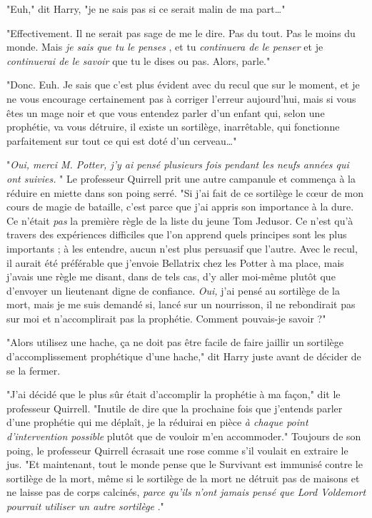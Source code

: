 "Euh," dit Harry, "je ne sais pas si ce serait malin de ma part…"

"Effectivement. Il ne serait pas sage de me le dire. Pas du tout. Pas le moins du monde. Mais \emph{je sais que tu le penses} , et tu \emph{continuera de le penser}  et je \emph{continuerai de le savoir}  que tu le dises ou pas. Alors, parle."

"Donc. Euh. Je sais que c'est plus évident avec du recul que sur le moment, et je ne vous encourage certainement pas à corriger l'erreur aujourd'hui, mais si vous êtes un mage noir et que vous entendez parler d'un enfant qui, selon une prophétie, va vous détruire, il existe un sortilège, inarrêtable, qui fonctionne parfaitement sur tout ce qui est doté d'un cerveau…"

"\emph{Oui, merci M. Potter, j'y ai pensé plusieurs fois pendant les neufs années qui ont suivies.} " Le professeur Quirrell prit une autre campanule et commença à la réduire en miette dans son poing serré. "Si j'ai fait de ce sortilège le cœur de mon cours de magie de bataille, c'est parce que j'ai appris son importance à la dure. Ce n'était \emph{pas}  la première règle de la liste du jeune Tom Jedusor. Ce n'est qu'à travers des expériences difficiles que l'on apprend quels principes sont les plus importants ; à les entendre, aucun n'est plus persuasif que l'autre. Avec le recul, il aurait été préférable que j'envoie Bellatrix chez les Potter à ma place, mais j'avais une règle me disant, dans de tels cas, d'y aller moi-même plutôt que d'envoyer un lieutenant digne de confiance. \emph{Oui,}  j'ai pensé au sortilège de la mort, mais je me suis demandé si, lancé sur un nourrisson, il ne rebondirait pas sur moi et n'accomplirait pas la prophétie. Comment pouvais-je savoir ?"

"Alors utilisez une hache, ça ne doit pas être facile de faire jaillir un sortilège d'accomplissement prophétique d'une hache," dit Harry juste avant de décider de se la fermer.

"J'ai décidé que le plus sûr était d'accomplir la prophétie à ma façon," dit le professeur Quirrell. "Inutile de dire que la prochaine fois que j'entends parler d'une prophétie qui me déplaît, je la réduirai en pièce \emph{à chaque point d'intervention possible}  plutôt que de vouloir m'en accommoder." Toujours de son poing, le professeur Quirrell écrasait une rose comme s'il voulait en extraire le jus. "Et maintenant, tout le monde pense que le Survivant est immunisé contre le sortilège de la mort, même si le sortilège de la mort ne détruit pas de maisons et ne laisse pas de corps calcinés, \emph{parce qu'ils n'ont jamais pensé que Lord Voldemort pourrait utiliser un autre sortilège} ."

